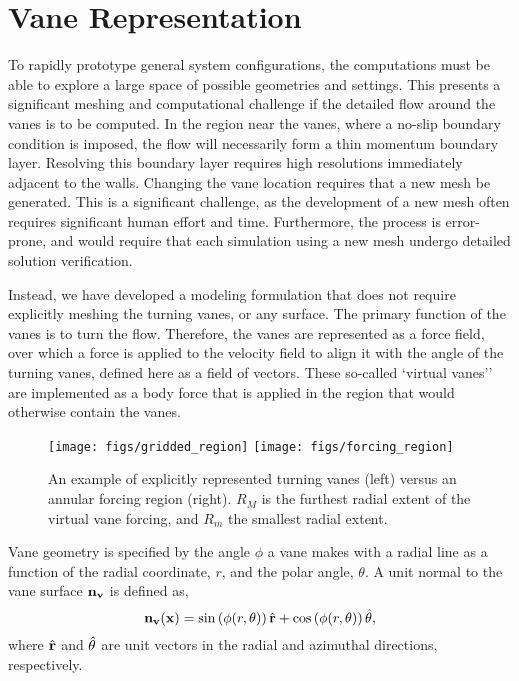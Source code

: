 \section{Vane Representation}
\label{subsec:vane}
To rapidly prototype general system configurations, the
computations must be able to explore a large space of possible
geometries and settings. This presents a significant meshing and 
computational challenge if the detailed flow around the vanes is to be
computed. In the region near the vanes, where a no-slip boundary
condition is imposed, the flow will necessarily form a thin momentum
boundary layer. Resolving this boundary layer requires high resolutions
immediately adjacent to the walls. Changing the vane location requires
that a new mesh be generated. This is a significant
challenge, as the development of a new mesh often requires significant
human effort and time. Furthermore, the process is error-prone, 
and would require that each simulation using a new mesh undergo 
detailed solution verification. 



Instead, we have developed a modeling formulation that does not require
explicitly meshing the turning vanes, or any surface. The primary function
of the vanes is to turn the flow.
Therefore, the vanes are represented as a force field, over 
which a force is applied to the velocity field to align it 
with the angle of the turning vanes, defined here as a 
field of vectors. These so-called `virtual vanes'' are implemented as a
body force that is applied in the region that would otherwise contain
the vanes.  
%
   \begin{figure}[!htb]
    \centering
    \texttt{[image: figs/gridded\_region]}
    \hfill
    \texttt{[image: figs/forcing\_region]}
     \caption{An example of explicitly represented turning vanes (left)
    versus an annular forcing region (right). $R_{M}$ is the furthest
    radial extent of the virtual vane forcing, and $R_{m}$ the smallest
    radial extent. } 
     \label{fig:penalty_model}
   \end{figure}
%
Vane geometry is specified by the angle $\phi$ a vane makes with a
radial line as a function of the radial coordinate, $r$, and the polar
angle, $\theta$. A unit normal to the vane surface ${\bf n_v}$ is defined
as,
%
\begin{equation}
 {\bf n_v}({\bf x}) = \sin \left(\phi(r,\theta) \right) \hat{{\bf r}}+ \cos
  \left(\phi(r,\theta) \right) \hat{{\bf \theta}},
\end{equation}
%
where $\hat{{\bf r}}$ and $\hat{{\bf \theta}}$ are unit
vectors in the radial and azimuthal directions, respectively.

